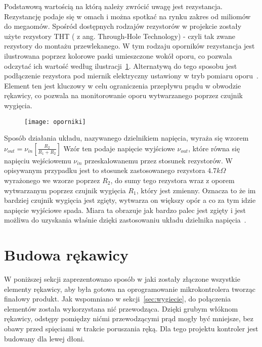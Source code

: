 	Podstawową wartością na którą należy zwrócić uwagę jest rezystancja. Rezystancję podaje się w omach i można spotkać na rynku zakres od miliomów do megaomów. Spośród dostępnych rodzajów rezystorów w projekcie zostały użyte rezystory THT ( z ang. Through-Hole Technology) - czyli tak zwane rezystory do montażu przewlekanego. W tym rodzaju oporników rezystancja jest ilustrowana poprzez kolorowe paski umieszczone wokół oporu, co pozwala odczytać ich wartość według ilustracji~\ref{fig:oporniki}. Alternatywą do tego sposobu jest podłączenie rezystora pod miernik elektryczny ustawiony w tryb pomiaru oporu~\cite{rezystor}. Element ten jest kluczowy w celu ograniczenia przepływu prądu w obwodzie rękawicy, co pozwala na monitorowanie oporu wytwarzanego poprzez czujnik wygięcia.
		
\begin{figure}[h]
\centering
\texttt{[image: oporniki]}
\label{fig:oporniki}
\end{figure}
	
Sposób działania układu, nazywanego dzielnikiem napięcia, wyraża się wzorem
	$
		\nu_{out} = \nu_{in}\left[ \frac{R_2}{R_1+R_2}\right]
	$	
Wzór ten podaje napięcie wyjściowe $\nu_{out}$, które równa się napięciu wejściowemu $\nu_{in}$ przeskalowanemu przez stosunek rezystorów. W opisywanym przypadku jest to stosunek zastosowanego rezystora $4.7 k\Omega$ wyrażonego we wzorze poprzez $R_2$, do sumy tego rezystora wraz z oporem wytwarzanym poprzez czujnik wygięcia $R_1$, który jest zmienny. Oznacza to że im bardziej czujnik wygięcia jest zgięty, wytwarza on większy opór a co za tym idzie napięcie wyjściowe spada. Miara ta obrazuje jak bardzo palec jest zgięty i jest możliwa do uzyskania właśnie dzięki zastosowaniu układu dzielnika napięcia~\cite{v-divider}.


\section{Budowa rękawicy}
\label{sec:budowa}

W poniższej sekcji zaprezentowano sposób w jaki zostały złączone wszystkie elementy rękawicy, aby była gotowa na oprogramowanie mikrokontrolera tworząc finałowy produkt. Jak wspomniano w sekcji~\ref{sec:wygiecie}, do połączenia elementów została wykorzystana nić przewodząca. Dzięki grubym włóknom rękawicy, odstępy pomiędzy nićmi przewodzącymi prąd mogły być mniejsze, bez obawy przed spięciami w trakcie poruszania ręką. Dla tego projektu kontroler jest budowany dla lewej dłoni.

